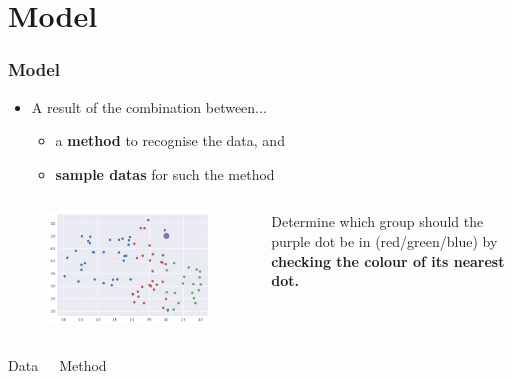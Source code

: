 \documentclass[aspectratio=169]{beamer}
\begin{document}
\section{Model}

\begin{frame}
	\frametitle{Model}
	\begin{itemize}
		\item<2-> A result of the combination between...
		      \begin{itemize}
			      \item<3-> a \textbf{method} to recognise the data, and
			      \item<4-> \textbf{sample datas} for such the method
		      \end{itemize}
	\end{itemize}
	\begin{columns}
		\begin{figure}
			\includegraphics[scale=.3]{imgs/simple_knn.png}
		\end{figure}
		Determine which group should the purple dot be in (red/green/blue) by \textbf{checking the colour of its nearest dot.}
	\end{columns}
	\begin{columns}
		\column{0.5\textwidth}
		\begin{center}
			 \Large Data
		\end{center}
		\column{0.5\textwidth}
		\begin{center}
			 \Large Method
		\end{center}
	\end{columns}
\end{frame}
\end{document}
